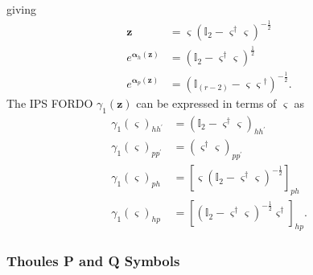 \documentclass[aps,preprint]{revtex4}%
\begin{document}
giving%
\begin{align}
\mathbf{z}  &  =\mathbf{\varsigma}\left(  \mathbb{I}_{2}-\mathbf{\varsigma
}^{\dagger}\mathbf{\varsigma}\right)  ^{-\frac{1}{2}}\nonumber\\
e^{\mathbf{\alpha}_{h}\left(  \mathbf{z}\right)  }  &  =\left(  \mathbb{I}%
_{2}-\mathbf{\varsigma}^{\dagger}\mathbf{\varsigma}\right)  ^{\frac{1}{2}%
}\nonumber\\
e^{\mathbf{\alpha}_{p}\left(  \mathbf{z}\right)  }  &  =\left(  \mathbb{I}%
_{\left(  r-2\right)  }-\mathbf{\varsigma\varsigma}^{\dagger}\right)
^{-\frac{1}{2}}.
\end{align}
The IPS FORDO $\gamma_{1}\left(  \mathbf{z}\right)  $ can be expressed in
terms of $\mathbf{\varsigma}$ as
\begin{align}
\gamma_{1}\left(  \mathbf{\varsigma}\right)  _{hh^{\prime}}  &  =\left(
\mathbb{I}_{2}-\mathbf{\varsigma}^{\dagger}\mathbf{\varsigma}\right)
_{hh^{\prime}}\nonumber\\
\gamma_{1}\left(  \mathbf{\varsigma}\right)  _{pp^{\prime}}  &  =\left(
\mathbf{\varsigma}^{\dagger}\mathbf{\varsigma}\right)  _{pp^{\prime}%
}\nonumber\\
\gamma_{1}\left(  \mathbf{\varsigma}\right)  _{ph}  &  =\left[
\mathbf{\varsigma}\left(  \mathbb{I}_{2}-\mathbf{\varsigma}^{\dagger
}\mathbf{\varsigma}\right)  ^{-\frac{1}{2}}\right]  _{ph}\nonumber\\
\gamma_{1}\left(  \mathbf{\varsigma}\right)  _{hp}  &  =\left[  \left(
\mathbb{I}_{2}-\mathbf{\varsigma}^{\dagger}\mathbf{\varsigma}\right)
^{-\frac{1}{2}}\mathbf{\varsigma}^{\dagger}\right]  _{hp}.
\end{align}


\subsubsection{Thoules P and Q Symbols}
\end{document}

